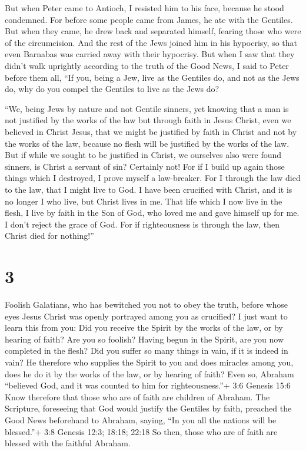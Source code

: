  But when Peter came to Antioch, I resisted him to his
face, because he stood condemned.  For before some people
came from James, he ate with the Gentiles. But when they came, he drew
back and separated himself, fearing those who were of the circumcision.
 And the rest of the Jews joined him in his hypocrisy, so
that even Barnabas was carried away with their hypocrisy. 
But when I saw that they didn't walk uprightly according to the truth of
the Good News, I said to Peter before them all, ``If you, being a Jew,
live as the Gentiles do, and not as the Jews do, why do you compel the
Gentiles to live as the Jews do?

 ``We, being Jews by nature and not Gentile sinners,
 yet knowing that a man is not justified by the works of
the law but through faith in Jesus Christ, even we believed in Christ
Jesus, that we might be justified by faith in Christ and not by the
works of the law, because no flesh will be justified by the works of the
law.  But if while we sought to be justified in Christ, we
ourselves also were found sinners, is Christ a servant of sin? Certainly
not!  For if I build up again those things which I
destroyed, I prove myself a law-breaker.  For I through the
law died to the law, that I might live to God.  I have been
crucified with Christ, and it is no longer I who live, but Christ lives
in me. That life which I now live in the flesh, I live by faith in the
Son of God, who loved me and gave himself up for me.  I
don't reject the grace of God. For if righteousness is through the law,
then Christ died for nothing!''

\hypertarget{section-2}{%
\section{3}\label{section-2}}

 Foolish Galatians, who has bewitched you not to obey the
truth, before whose eyes Jesus Christ was openly portrayed among you as
crucified?  I just want to learn this from you: Did you
receive the Spirit by the works of the law, or by hearing of faith?
 Are you so foolish? Having begun in the Spirit, are you now
completed in the flesh?  Did you suffer so many things in
vain, if it is indeed in vain?  He therefore who supplies
the Spirit to you and does miracles among you, does he do it by the
works of the law, or by hearing of faith?  Even so, Abraham
``believed God, and it was counted to him for righteousness.''+ 3:6
Genesis 15:6  Know therefore that those who are of faith are
children of Abraham.  The Scripture, foreseeing that God
would justify the Gentiles by faith, preached the Good News beforehand
to Abraham, saying, ``In you all the nations will be blessed.''+ 3:8
Genesis 12:3; 18:18; 22:18  So then, those who are of faith
are blessed with the faithful Abraham.

